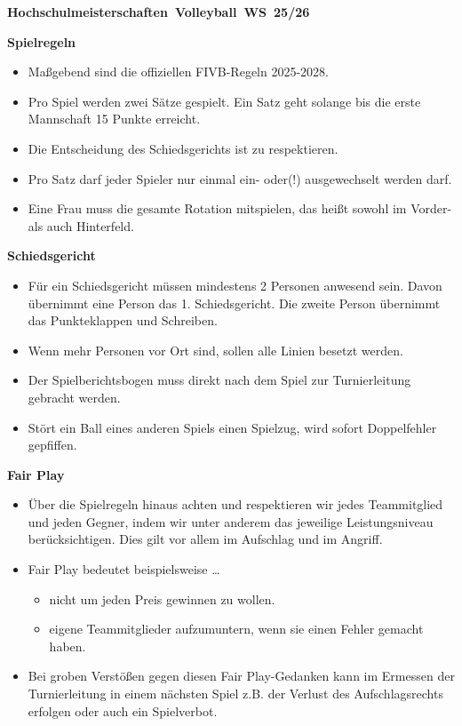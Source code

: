 \documentclass[
	headinclude=false,
	footinclude=false,
        12pt,
	]{scrartcl}
\begin{document}
    \begin{center}
        {\LARGE\textbf{\mbox{Hochschulmeisterschaften Volleyball WS 25/26}}}
    \end{center}
    \vspace{1.5em}
{\Large\textbf{Spielregeln}}
\large
\begin{itemize}
    \item Maßgebend sind die offiziellen FIVB-Regeln 2025-2028.
    \item Pro Spiel werden zwei Sätze gespielt. Ein Satz geht solange bis die erste Mannschaft 15 Punkte erreicht.
    \item Die Entscheidung des Schiedsgerichts ist zu respektieren.
    \item Pro Satz darf jeder Spieler nur einmal ein- oder(!) ausgewechselt werden darf. 
    \item Eine Frau muss die gesamte Rotation mitspielen, das heißt sowohl im Vorder- als auch Hinterfeld. 
\end{itemize}   
\vspace{1cm}
 {\Large\textbf{Schiedsgericht}}
\begin{itemize}
    \item Für ein Schiedsgericht müssen mindestens 2 Personen anwesend sein. Davon übernimmt eine Person das 1. Schiedsgericht. Die zweite Person übernimmt das Punkteklappen und Schreiben.
    \item Wenn mehr Personen vor Ort sind, sollen alle Linien besetzt werden. 
    \item Der Spielberichtsbogen muss direkt nach dem Spiel zur Turnierleitung gebracht werden.
    \item Stört ein Ball eines anderen Spiels einen Spielzug, wird sofort Doppelfehler gepfiffen.
\end{itemize}  
\vspace{1cm}
 {\Large\textbf{Fair Play}}
\begin{itemize}
    \item Über die Spielregeln hinaus achten und respektieren wir jedes Teammitglied und jeden Gegner, indem wir unter anderem das jeweilige Leistungsniveau berücksichtigen. Dies gilt vor allem im Aufschlag und im Angriff.
    \item Fair Play bedeutet beispielsweise \ldots
    \begin{itemize}
        \item[\ldots] nicht um jeden Preis gewinnen zu wollen.
        \item[\ldots] eigene Teammitglieder aufzumuntern, wenn sie einen Fehler gemacht haben.
    \end{itemize}
    \item Bei groben Verstößen gegen diesen Fair Play-Gedanken kann im Ermessen der Turnierleitung in einem nächsten Spiel z.B. der Verlust des Aufschlagsrechts erfolgen oder auch ein Spielverbot.
\end{itemize}    
\end{document}
